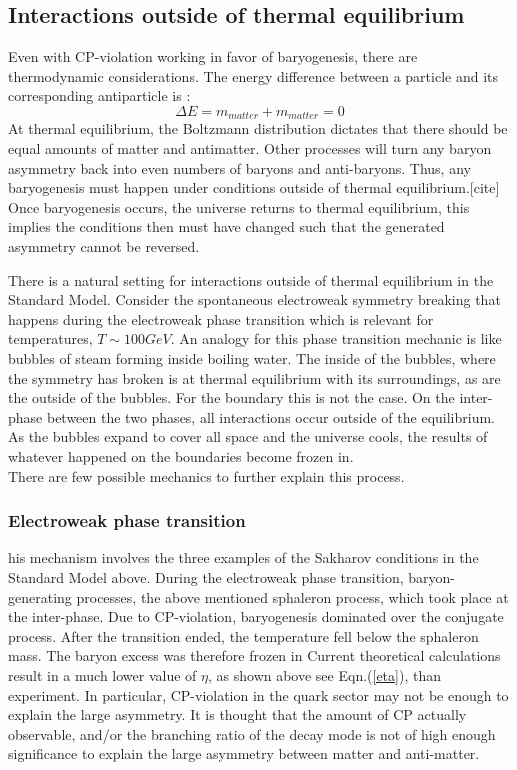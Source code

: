 \subsection{Interactions outside of thermal equilibrium}
Even with CP-violation working in favor of baryogenesis, there are thermodynamic considerations. The energy difference between a particle and its corresponding antiparticle is \cite{5}:
\begin{equation}
\Delta E = m_{matter} + m_{matter} = 0
\end{equation}
At thermal equilibrium, the Boltzmann distribution dictates that there should be equal amounts of matter and antimatter. Other processes will turn any baryon asymmetry back into even numbers of baryons and anti-baryons. Thus, any baryogenesis must happen under conditions outside of thermal equilibrium.[cite] Once baryogenesis occurs, the universe returns to thermal equilibrium, this implies the conditions then must have changed such that the generated asymmetry cannot be reversed.\cite{5} \cite{13}
\par There is a natural setting for interactions outside of thermal equilibrium in the Standard Model. Consider the spontaneous electroweak symmetry breaking that happens during the electroweak phase transition  which is relevant for temperatures, $ T \sim 100 GeV $. An analogy for this phase transition mechanic is like bubbles of steam forming inside boiling water. The inside of the bubbles, where the symmetry has broken is at thermal equilibrium with its surroundings, as are the outside of the bubbles. For the boundary this is not the case. On the inter-phase between the two phases, all interactions occur outside of the equilibrium. As the bubbles expand to cover all space and the universe cools, the results of whatever happened on the boundaries become frozen in.\cite{5}\\
There are few possible mechanics to further explain this process.
\subsubsection{Electroweak phase transition}
his mechanism involves the three examples of the Sakharov conditions in the Standard Model above. During the electroweak phase transition, baryon-generating processes, the above mentioned sphaleron process, which took place at the inter-phase. Due to CP-violation, baryogenesis dominated over the conjugate process. After the transition ended, the temperature fell below the sphaleron mass. The baryon excess was therefore frozen in \cite{5} Current theoretical calculations result in a much lower value of $\eta$, as shown above see Eqn.(\ref{eta}), than experiment. In particular, CP-violation in the quark sector may not be enough to explain the large asymmetry. 
It is thought that the amount of CP actually observable, and/or the branching ratio of the decay mode is not of high enough significance to explain the large asymmetry between matter and anti-matter.
